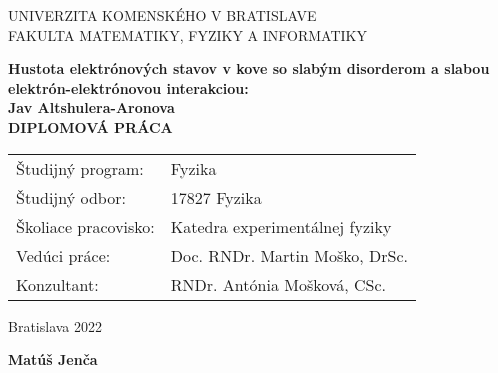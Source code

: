 \newpage
\thispagestyle{empty}
\begin{center}
{\large UNIVERZITA KOMENSKÉHO V BRATISLAVE \\
FAKULTA MATEMATIKY, FYZIKY A INFORMATIKY}
\end{center}


\vspace{5cm}
\begin{center}
{\large \bf Hustota elektrónových stavov v kove so slabým disorderom a slabou elektrón-elektrónovou interakciou:\\ Jav Altshulera-Aronova\\
\vspace{3cm}
DIPLOMOVÁ PRÁCA}
\end{center}

\vfill
\begin{flushleft}
\begin{tabular}{ll}
Študijný program: & Fyzika \\
Študijný odbor: & 17827 Fyzika \\
Školiace pracovisko: & Katedra experimentálnej fyziky \\
Vedúci práce: & Doc. RNDr. Martin Moško, DrSc. \\
Konzultant: & RNDr. Antónia Mošková, CSc. \\
\end{tabular}
\end{flushleft}

\vfill
%
\begin{multicols}{2}
\begin{flushleft} Bratislava 2022 \end{flushleft}
\begin{flushright} {\bf Matúš Jenča} \end{flushright}
\end{multicols}

